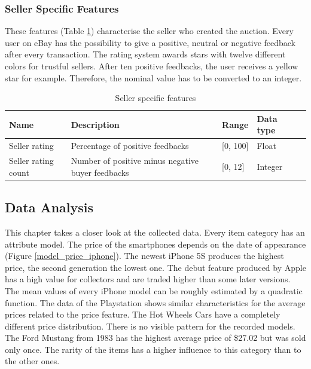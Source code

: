 \subsubsection{Seller Specific Features}
These features (Table \ref{tab:seller_features}) characterise the seller who created the auction. Every user on eBay has the possibility to give a positive, neutral or negative feedback after every transaction. The rating system awards stars with twelve different colors for trustful sellers. After ten positive feedbacks, the user receives a yellow star for example. Therefore, the nominal value has to be converted to an integer.
\begin{table}[h!]
	\begin{center}
	\begin{tabular}{| p{2.6cm} | p{2.6cm} | p{2.6cm} | p{2.6cm} | p{2.6cm} |}
		\hline
		\textbf{Name} & \textbf{Description} &  \textbf{Range} & \textbf{Data type} \\
		\hline
		Seller rating & Percentage of positive feedbacks & [0, 100] & Float \\
		\hline
		Seller rating count & Number of positive minus negative buyer feedbacks & [0, 12] & Integer \\
		\hline
	\end{tabular}
	\end{center}
	\caption{Seller specific features}
	\label{tab:seller_features}
\end{table}
\subsection{Data Analysis}
This chapter takes a closer look at the collected data. Every item category has an attribute model. The price of the smartphones depends on the date of appearance (Figure \ref{model_price_iphone}). The newest iPhone 5S produces the highest price, the second generation the lowest one. The debut feature produced by Apple has a high value for collectors and are traded higher than some later versions. The mean values of every iPhone model can be roughly estimated by a quadratic function. The data of the Playstation shows similar characteristics for the average prices related to the price feature. The Hot Wheels Cars have a completely different price distribution. There is no visible pattern for the recorded models. The Ford Mustang from 1983 has the highest average price of \$27.02 but was sold only once. The rarity of the items has a higher influence to this category than to the other ones.

